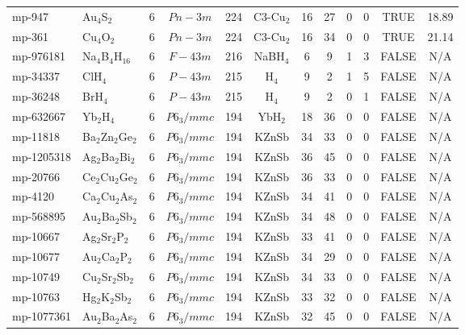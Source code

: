 {\begin{longtable}{llcccccccccc}
    mp-947 & Au$_{4}$S$_{2}$ & 6     & $Pn-3m$ & 224   & C3-Cu$_{2}$ & 16    & 27    & 0     & 0     & TRUE  & 18.89  \\
    mp-361 & Cu$_{4}$O$_{2}$ & 6     & $Pn-3m$ & 224   & C3-Cu$_{2}$ & 16    & 34    & 0     & 0     & TRUE  & 21.14  \\
    mp-976181 & Na$_{4}$B$_{4}$H$_{16}$ & 6     & $F-43m$ & 216   & NaBH$_{4}$ & 6     & 9     & 1     & 3     & FALSE & N/A \\
    mp-34337 & ClH$_{4}$ & 6     & $P-43m$ & 215   & H$_{4}$ & 9     & 2     & 1     & 5     & FALSE & N/A \\
    mp-36248 & BrH$_{4}$ & 6     & $P-43m$ & 215   & H$_{4}$ & 9     & 2     & 0     & 1     & FALSE & N/A \\
    mp-632667 & Yb$_{2}$H$_{4}$ & 6     & $P6_3/mmc$ & 194   & YbH$_{2}$ & 18    & 36    & 0     & 0     & FALSE & N/A \\
    mp-11818 & Ba$_{2}$Zn$_{2}$Ge$_{2}$ & 6     & $P6_3/mmc$ & 194   & KZnSb & 34    & 33    & 0     & 0     & FALSE & N/A \\
    mp-1205318 & Ag$_{2}$Ba$_{2}$Bi$_{2}$ & 6     & $P6_3/mmc$ & 194   & KZnSb & 36    & 45    & 0     & 0     & FALSE & N/A \\
    mp-20766 & Ce$_{2}$Cu$_{2}$Ge$_{2}$ & 6     & $P6_3/mmc$ & 194   & KZnSb & 36    & 33    & 0     & 0     & FALSE & N/A \\
    mp-4120 & Ca$_{2}$Cu$_{2}$As$_{2}$ & 6     & $P6_3/mmc$ & 194   & KZnSb & 34    & 41    & 0     & 0     & FALSE & N/A \\
    mp-568895 & Au$_{2}$Ba$_{2}$Sb$_{2}$ & 6     & $P6_3/mmc$ & 194   & KZnSb & 34    & 48    & 0     & 0     & FALSE & N/A \\
    mp-10667 & Ag$_{2}$Sr$_{2}$P$_{2}$ & 6     & $P6_3/mmc$ & 194   & KZnSb & 33    & 41    & 0     & 0     & FALSE & N/A \\
    mp-10677 & Au$_{2}$Ca$_{2}$P$_{2}$ & 6     & $P6_3/mmc$ & 194   & KZnSb & 34    & 29    & 0     & 0     & FALSE & N/A \\
    mp-10749 & Cu$_{2}$Sr$_{2}$Sb$_{2}$ & 6     & $P6_3/mmc$ & 194   & KZnSb & 34    & 33    & 0     & 0     & FALSE & N/A \\
    mp-10763 & Hg$_{2}$K$_{2}$Sb$_{2}$ & 6     & $P6_3/mmc$ & 194   & KZnSb & 33    & 32    & 0     & 0     & FALSE & N/A \\
    mp-1077361 & Au$_{2}$Ba$_{2}$As$_{2}$ & 6     & $P6_3/mmc$ & 194   & KZnSb & 32    & 45    & 0     & 0     & FALSE & N/A \\

\end{longtable}}
